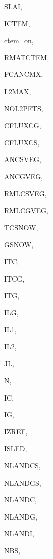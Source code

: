 {\begin{DoxyParamCaption}
\item[{real, dimension(ilg,ictem)}]{S\+L\+A\+I, }
\item[{integer}]{I\+C\+T\+E\+M, }
\item[{logical}]{ctem\+\_\+on, }
\item[{real, dimension(ilg,ictem,ig)}]{R\+M\+A\+T\+C\+T\+E\+M, }
\item[{real, dimension(ilg,ictem)}]{F\+C\+A\+N\+C\+M\+X, }
\item[{integer}]{L2\+M\+A\+X, }
\item[{integer, dimension(ic)}]{N\+O\+L2\+P\+F\+T\+S, }
\item[{real, dimension(ilg)}]{C\+F\+L\+U\+X\+C\+G, }
\item[{real, dimension(ilg)}]{C\+F\+L\+U\+X\+C\+S, }
\item[{real, dimension(ilg,ictem)}]{A\+N\+C\+S\+V\+E\+G, }
\item[{real, dimension(ilg,ictem)}]{A\+N\+C\+G\+V\+E\+G, }
\item[{real, dimension(ilg,ictem)}]{R\+M\+L\+C\+S\+V\+E\+G, }
\item[{real, dimension(ilg,ictem)}]{R\+M\+L\+C\+G\+V\+E\+G, }
\item[{real, dimension(ilg)}]{T\+C\+S\+N\+O\+W, }
\item[{real, dimension (ilg)}]{G\+S\+N\+O\+W, }
\item[{integer}]{I\+T\+C, }
\item[{integer}]{I\+T\+C\+G, }
\item[{integer}]{I\+T\+G, }
\item[{integer}]{I\+L\+G, }
\item[{integer}]{I\+L1, }
\item[{integer}]{I\+L2, }
\item[{integer}]{J\+L, }
\item[{integer}]{N, }
\item[{integer}]{I\+C, }
\item[{integer}]{I\+G, }
\item[{integer}]{I\+Z\+R\+E\+F, }
\item[{integer}]{I\+S\+L\+F\+D, }
\item[{integer}]{N\+L\+A\+N\+D\+C\+S, }
\item[{integer}]{N\+L\+A\+N\+D\+G\+S, }
\item[{integer}]{N\+L\+A\+N\+D\+C, }
\item[{integer}]{N\+L\+A\+N\+D\+G, }
\item[{integer}]{N\+L\+A\+N\+D\+I, }
\item[{integer}]{N\+B\+S, }

\end{DoxyParamCaption}}
